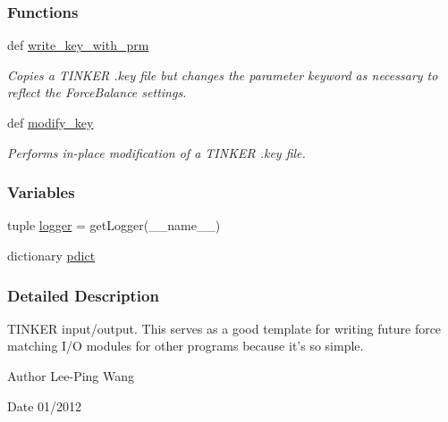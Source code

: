 \subsubsection*{Functions}
\begin{DoxyCompactItemize}
\item 
def \hyperlink{namespaceforcebalance_1_1tinkerio_a9cde7bd64c6f5286c1f33a39211d5a11}{write\-\_\-key\-\_\-with\-\_\-prm}
\begin{DoxyCompactList}\small\item\em Copies a T\-I\-N\-K\-E\-R .key file but changes the parameter keyword as necessary to reflect the Force\-Balance settings. \end{DoxyCompactList}\item 
def \hyperlink{namespaceforcebalance_1_1tinkerio_aa82c424420ad59b6a78b273d6c1fd469}{modify\-\_\-key}
\begin{DoxyCompactList}\small\item\em Performs in-\/place modification of a T\-I\-N\-K\-E\-R .key file. \end{DoxyCompactList}\end{DoxyCompactItemize}
\subsubsection*{Variables}
\begin{DoxyCompactItemize}
\item 
tuple \hyperlink{namespaceforcebalance_1_1tinkerio_afc11cbd0e4ef0c777487ccb9708e0b08}{logger} = get\-Logger(\-\_\-\-\_\-name\-\_\-\-\_\-)
\item 
dictionary \hyperlink{namespaceforcebalance_1_1tinkerio_a714d1b926359d7d11559720e422ec34d}{pdict}
\end{DoxyCompactItemize}


\subsubsection{Detailed Description}
T\-I\-N\-K\-E\-R input/output. This serves as a good template for writing future force matching I/\-O modules for other programs because it's so simple.

\begin{DoxyAuthor}{Author}
Lee-\/\-Ping Wang 
\end{DoxyAuthor}
\begin{DoxyDate}{Date}
01/2012 
\end{DoxyDate}


